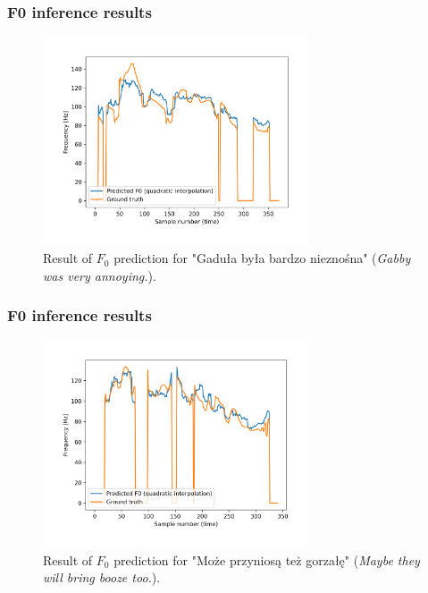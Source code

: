 \documentclass[a4paper,9pt]{beamer}
\theoremstyle{mytheoremstyle}
\begin{document}
\begin{frame}
\frametitle{F0 inference results}
\begin{figure}
\begin{center}
  \includegraphics[width=0.7\textwidth]{res/amu_pl_ilo_BAZA_2006C_C0221_simple_pred_freq}
\end{center}
	\caption{Result of $F_0$ prediction for "Gadu\l{}a by\l{}a bardzo niezno\'sna" (\textit{Gabby was very annoying.}).}
\end{figure}
\end{frame}

\begin{frame}
\frametitle{F0 inference results}
\begin{figure}
\begin{center}
  \includegraphics[width=0.7\textwidth]{res/amu_pl_ilo_BAZA_2006C_C0271_simple_pred_freq}
\end{center}
	\caption{Result of $F_0$ prediction for "Mo\.ze przynios\k{a} te\.z gorza\l{}\k{e}" (\textit{Maybe they will bring booze too.}).}
\end{figure}
\end{frame}
\end{document}
